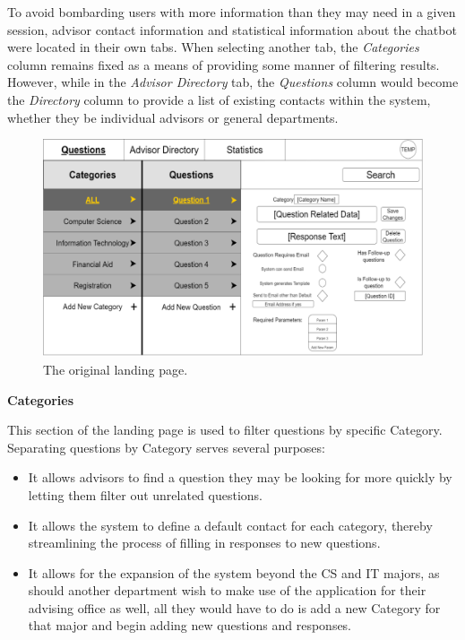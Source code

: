\documentclass[titlepage, 12pt]{article}
\begin{document}
To avoid bombarding users with more information than they may need in a given session, advisor contact information and statistical information about the chatbot were located in their own tabs. When selecting another tab, the \emph{Categories} column remains fixed as a means of providing some manner of filtering results. However, while in the \emph{Advisor Directory} tab, the \emph{Questions} column would become the \emph{Directory} column to provide a list of existing contacts within the system, whether they be individual advisors or general departments.

\begin{figure}[h]
    \centering\includegraphics[width=1\linewidth]{images/original-landing-page.png}
    \caption{The original landing page.}
\end{figure}

\textbf{Categories}

This section of the landing page is used to filter questions by specific Category. Separating questions by Category serves several purposes:

\begin{itemize}
    \item It allows advisors to find a question they may be looking for more quickly by letting them filter out unrelated questions.
    \item It allows the system to define a default contact for each category, thereby streamlining the process of filling in responses to new questions.
    \item It allows for the expansion of the system beyond the CS and IT majors, as should another department wish to make use of the application for their advising office as well, all they would have to do is add a new Category for that major and begin adding new questions and responses.
\end{itemize}
\end{document}
